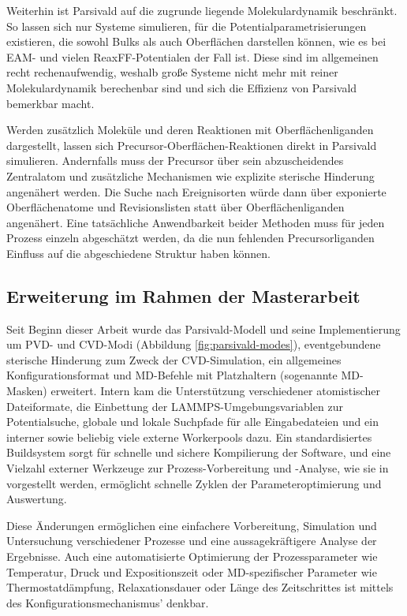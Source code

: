 Weiterhin ist Parsivald auf die zugrunde liegende Molekulardynamik beschränkt.
So lassen sich nur Systeme simulieren, für die Potentialparametrisierungen existieren, die sowohl Bulks als auch Oberflächen darstellen können, wie es bei EAM- und vielen ReaxFF-Potentialen der Fall ist.
Diese sind im allgemeinen recht rechenaufwendig, weshalb große Systeme nicht mehr mit reiner Molekulardynamik berechenbar sind und sich die Effizienz von Parsivald bemerkbar macht.

Werden zusätzlich Moleküle und deren Reaktionen mit Oberflächenliganden dargestellt, lassen sich Precursor-Oberflächen-Reaktionen direkt in Parsivald simulieren.
Andernfalls muss der Precursor über sein abzuscheidendes Zentralatom und zusätzliche Mechanismen wie explizite sterische Hinderung angenähert werden.
Die Suche nach Ereignisorten würde dann über exponierte Oberflächenatome und Revisionslisten statt über Oberflächenliganden angenähert.
Eine tatsächliche Anwendbarkeit beider Methoden muss für jeden Prozess einzeln abgeschätzt werden, da die nun fehlenden Precursorliganden Einfluss auf die abgeschiedene Struktur haben können.

\subsection{Erweiterung im Rahmen der Masterarbeit}

Seit Beginn dieser Arbeit wurde das Parsivald-Modell und seine Implementierung um PVD- und CVD-Modi (Abbildung \ref{fig:parsivald-modes}), eventgebundene sterische Hinderung zum Zweck der CVD-Simu\-lation, ein allgemeines Konfigurationsformat und MD-Befehle mit Platzhaltern (sogenannte MD-Masken) erweitert.
Intern kam die Unterstützung verschiedener atomistischer Dateiformate, die Einbettung der LAMMPS-Umgebungs\-variablen zur Potentialsuche, globale und lokale Suchpfade für alle Eingabedateien und ein interner sowie beliebig viele externe Workerpools dazu.
Ein standardisiertes Buildsystem sorgt für schnelle und sichere Kompilierung der Software, und eine Vielzahl externer Werkzeuge zur Prozess-Vorbereitung und -Analyse, wie sie in  vorgestellt werden, ermöglicht schnelle Zyklen der Parameteroptimierung und Auswertung.

Diese Änderungen ermöglichen eine einfachere Vorbereitung, Simulation und Untersuchung verschiedener Prozesse und eine aussagekräftigere Analyse der Ergebnisse.
Auch eine automatisierte Optimierung der Prozessparameter wie Temperatur, Druck und Expositionszeit oder MD-spezifischer Parameter wie Thermostatdämpfung, Relaxationsdauer oder Länge des Zeitschrittes ist mittels des Konfigurationsmechanismus' denkbar.

